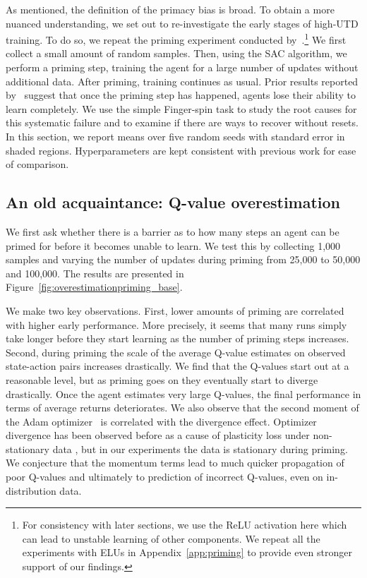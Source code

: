 As mentioned, the definition of the primacy bias is broad.
To obtain a more nuanced understanding, we set out to re-investigate the early stages of high-UTD training. To do so, we repeat the priming experiment conducted by~\textcite{nikishin2022primacy}.\footnote{For consistency with later sections, we use the ReLU activation here which can lead to unstable learning of other components. We repeat all the experiments with ELUs in Appendix~\ref{app:priming} to provide even stronger support of our findings.}
We first collect a small amount of random samples. Then, using the SAC algorithm, we perform a priming step, training the agent for a large number of updates without additional data. After priming, training continues as usual. Prior results reported by~\textcite{nikishin2022primacy} suggest that once the priming step has happened, agents lose their ability to learn completely. We use the simple Finger-spin task \parencite{tunyasuvunakool2020dmcontrol} to study the root causes for this systematic failure and to examine if there are ways to recover without resets. In this section, we report means over five random seeds with standard error in shaded regions. Hyperparameters are kept consistent with previous work for ease of comparison.

\subsection{An old acquaintance: Q-value overestimation} \label{sec:overestimation}
We first ask whether there is a barrier as to how many steps an agent can be primed for before it becomes unable to learn. We test this by collecting 1,000 samples and varying the number of updates during priming from 25,000 to 50,000 and 100,000. The results are presented in Figure~\ref{fig:overestimationpriming_base}. 

We make two key observations. First, lower amounts of priming are correlated with higher early performance. More precisely, it seems that many runs simply take longer before they start learning as the number of priming steps increases. Second, during priming the scale of the average Q-value estimates on observed state-action pairs increases drastically. We find that the Q-values start out at a reasonable level, but as priming goes on they eventually start to diverge drastically. Once the agent estimates very large Q-values, the final performance in terms of average returns deteriorates. We also observe that the second moment of the Adam optimizer~\parencite{kingma2015adam} is correlated with the divergence effect. Optimizer divergence has been observed before as a cause of plasticity loss under non-stationary data \parencite{lyle2023understanding}, but in our experiments the data is stationary during priming. We conjecture that the momentum terms lead to much quicker propagation of poor Q-values and ultimately to prediction of incorrect Q-values, even on in-distribution data.


